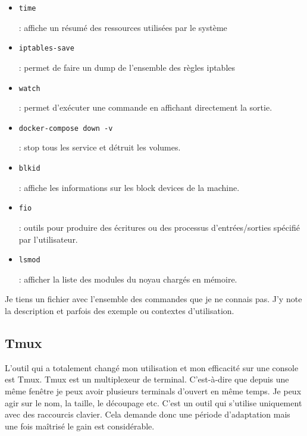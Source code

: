 \documentclass[12pt, a4paper, twoside]{article}
\begin{document}
\begin{itemize}
    \item \begin{code}\texttt{time}\end{code}: affiche un résumé des ressources utilisées par le système
    \item \begin{code}\texttt{iptables-save}\end{code}: permet de faire un dump de l'ensemble des règles iptables
    \item \begin{code}\texttt{watch}\end{code}: permet d'exécuter une commande en affichant directement la sortie.
    \item \begin{code}\texttt{docker-compose down -v}\end{code}: stop tous les service et détruit les volumes.
    \item \begin{code}\texttt{blkid}\end{code}: affiche les informations sur les block devices de la machine.
    \item \begin{code}\texttt{fio}\end{code}: outils pour produire des écritures ou des processus d'entrées/sorties spécifié par l'utilisateur.
    \item \begin{code}\texttt{lsmod}\end{code}: afficher la liste des modules du noyau chargés en mémoire. 

\end{itemize}

Je tiens un fichier avec l'ensemble des commandes que je ne connais pas.
J'y note la description et parfois des exemple ou contextes d'utilisation.


\subsection{Tmux}
L'outil qui a totalement changé mon utilisation et mon efficacité sur une console est Tmux.
Tmux est un multiplexeur de terminal.
C'est-à-dire que depuis une même fenêtre je peux avoir plusieurs terminals d'ouvert en même temps.
Je peux agir sur le nom, la taille, le découpage etc.
C'est un outil qui s'utilise uniquement avec des raccourcis clavier.
Cela demande donc une période d'adaptation mais une fois maîtrisé le gain est considérable.
\end{document}
